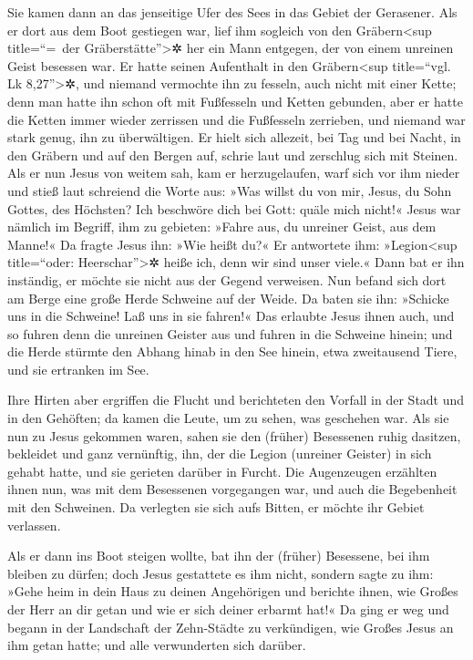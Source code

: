  Sie kamen dann an das jenseitige Ufer des Sees in das
Gebiet der Gerasener.  Als er dort aus dem Boot gestiegen
war, lief ihm sogleich von den Gräbern\textless sup title=``=~der
Gräberstätte''\textgreater✲ her ein Mann entgegen, der von einem
unreinen Geist besessen war.  Er hatte seinen Aufenthalt
in den Gräbern\textless sup title=``vgl. Lk 8,27''\textgreater✲, und
niemand vermochte ihn zu fesseln, auch nicht mit einer Kette;
 denn man hatte ihn schon oft mit Fußfesseln und Ketten
gebunden, aber er hatte die Ketten immer wieder zerrissen und die
Fußfesseln zerrieben, und niemand war stark genug, ihn zu überwältigen.
 Er hielt sich allezeit, bei Tag und bei Nacht, in den
Gräbern und auf den Bergen auf, schrie laut und zerschlug sich mit
Steinen.  Als er nun Jesus von weitem sah, kam er
herzugelaufen, warf sich vor ihm nieder  und stieß laut
schreiend die Worte aus: »Was willst du von mir, Jesus, du Sohn Gottes,
des Höchsten? Ich beschwöre dich bei Gott: quäle mich nicht!«
 Jesus war nämlich im Begriff, ihm zu gebieten: »Fahre
aus, du unreiner Geist, aus dem Manne!«  Da fragte Jesus
ihn: »Wie heißt du?« Er antwortete ihm: »Legion\textless sup
title=``oder: Heerschar''\textgreater✲ heiße ich, denn wir sind unser
viele.«  Dann bat er ihn inständig, er möchte sie nicht
aus der Gegend verweisen.  Nun befand sich dort am Berge
eine große Herde Schweine auf der Weide.  Da baten sie
ihn: »Schicke uns in die Schweine! Laß uns in sie fahren!«
 Das erlaubte Jesus ihnen auch, und so fuhren denn die
unreinen Geister aus und fuhren in die Schweine hinein; und die Herde
stürmte den Abhang hinab in den See hinein, etwa zweitausend Tiere, und
sie ertranken im See.

 Ihre Hirten aber ergriffen die Flucht und berichteten
den Vorfall in der Stadt und in den Gehöften; da kamen die Leute, um zu
sehen, was geschehen war.  Als sie nun zu Jesus gekommen
waren, sahen sie den (früher) Besessenen ruhig dasitzen, bekleidet und
ganz vernünftig, ihn, der die Legion (unreiner Geister) in sich gehabt
hatte, und sie gerieten darüber in Furcht.  Die
Augenzeugen erzählten ihnen nun, was mit dem Besessenen vorgegangen war,
und auch die Begebenheit mit den Schweinen.  Da verlegten
sie sich aufs Bitten, er möchte ihr Gebiet verlassen.

 Als er dann ins Boot steigen wollte, bat ihn der
(früher) Besessene, bei ihm bleiben zu dürfen;  doch
Jesus gestattete es ihm nicht, sondern sagte zu ihm: »Gehe heim in dein
Haus zu deinen Angehörigen und berichte ihnen, wie Großes der Herr an
dir getan und wie er sich deiner erbarmt hat!«  Da ging
er weg und begann in der Landschaft der Zehn-Städte zu verkündigen, wie
Großes Jesus an ihm getan hatte; und alle verwunderten sich darüber.

